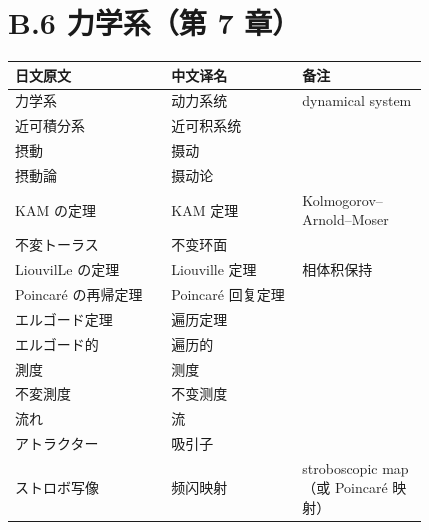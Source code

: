\section*{B.6 力学系（第 7 章）}
{\small
\begin{longtable}{p{0.31\linewidth} p{0.26\linewidth} p{0.25\linewidth}}
\toprule
日文原文 & 中文译名 & 备注 \\
\midrule
\endhead
力学系 & 动力系统 & dynamical system \\
近可積分系 & 近可积系统 &  \\
摂動 & 摄动 &  \\
摂動論 & 摄动论 &  \\
KAM の定理 & KAM 定理 & Kolmogorov–Arnold–Moser \\
不変トーラス & 不变环面 &  \\
LiouvilLe の定理 & Liouville 定理 & 相体积保持 \\
Poincaré の再帰定理 & Poincaré 回复定理 &  \\
エルゴード定理 & 遍历定理 &  \\
エルゴード的 & 遍历的 &  \\
測度 & 测度 &  \\
不変測度 & 不变测度 &  \\
流れ & 流 &  \\
アトラクター & 吸引子 &  \\
ストロボ写像 & 频闪映射 & stroboscopic map（或 Poincaré 映射） \\
\bottomrule
\end{longtable}
}

